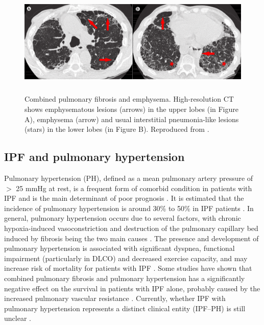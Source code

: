 \begin{figure}[htbp]
  \centering 
  \includegraphics[height=2.05in]{Background/Image/CPFEImaging.png}
  \caption{ Combined pulmonary fibrosis and emphysema. High-resolution CT shows emphysematous lesions (arrows) in the upper lobes (in Figure A), emphysema (arrow) and usual interstitial pneumonia-like lesions (stars) in the lower lobes (in Figure B). Reproduced from \citep{king2011idiopathic}.}
  \label{fig:CPFEImaging}
\end{figure}

\subsection{IPF and pulmonary hypertension}
Pulmonary hypertension (PH), defined as a mean pulmonary artery pressure of $>$ 25 mmHg at rest, is a frequent form of comorbid condition in patients with IPF and is the main determinant of poor prognosis \citep{raghu2011official, xaubet2017idiopathic}. It is estimated that the incidence of pulmonary hypertension is around 30\% to 50\% in IPF patients \citep{king2017idiopathic}. In general, pulmonary hypertension occurs due to several factors, with chronic hypoxia-induced vasoconstriction and destruction of the pulmonary capillary bed induced by fibrosis being the two main causes \citep{hayes2016influence}. The presence and development of pulmonary hypertension is associated with significant dyspnea, functional impairment (particularly in DLCO) and decreased exercise capacity, and may increase risk of mortality for patients with IPF \citep{mejia2009idiopathic,lettieri2006prevalence,nadrous2005impact}. Some studies have shown that combined pulmonary fibrosis and pulmonary hypertension has a significantly negative effect on the survival in patients with IPF alone, probably caused by the increased pulmonary vascular resistance \citep{raghu2011official, king2011idiopathic}. Currently, whether IPF with pulmonary hypertension represents a distinct  clinical entity (IPF–PH) is still unclear \citep{raghu2011official}.

